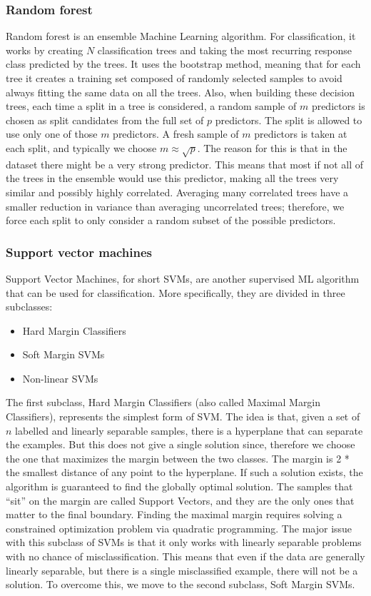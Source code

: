 \documentclass[journal]{IEEEtran}
\begin{document}
\subsubsection{Random forest}
Random forest is an ensemble Machine Learning algorithm. For classification, it works by creating $N$ classification trees and taking the most recurring response class predicted by the trees. It uses the bootstrap method, meaning that for each tree it creates a training set composed of randomly selected samples to avoid always fitting the same data on all the trees. Also, when building these decision trees, each time a split in a tree is considered, a random sample of $m$ predictors is chosen as split candidates from the full set of $p$ predictors. The split is allowed to use only one of those $m$ predictors. A fresh sample of $m$ predictors is taken at each split, and typically we choose $m \approx \sqrt{p}$. The reason for this is that in the dataset there might be a very strong predictor. This means that most if not all of the trees in the ensemble would use this predictor, making all the trees very similar and possibly highly correlated. Averaging many correlated trees have a smaller reduction in variance than averaging uncorrelated trees; therefore, we force each split to only consider a random subset of the possible predictors.

\subsubsection{Support vector machines}
Support Vector Machines, for short SVMs, are another supervised ML algorithm that can be used for classification. More specifically, they are divided in three subclasses:
\begin{itemize}
    \item Hard Margin Classifiers
    \item Soft Margin SVMs
    \item Non-linear SVMs
\end{itemize}
The first subclass, Hard Margin Classifiers (also called Maximal Margin Classifiers), represents the simplest form of SVM. The idea is that, given a set of $n$ labelled and linearly separable samples, there is a hyperplane that can separate the examples. But this does not give a single solution since, therefore we choose the one that maximizes the margin between the two classes. The margin is 2 * the smallest distance of any point to the hyperplane. If such a solution exists, the algorithm is guaranteed to find the globally optimal solution. The samples that “sit” on the margin are called Support Vectors, and they are the only ones that matter to the final boundary. Finding the maximal margin requires solving a constrained optimization problem via quadratic programming. The major issue with this subclass of SVMs is that it only works with linearly separable problems with no chance of misclassification. This means that even if the data are generally linearly separable, but there is a single misclassified example, there will not be a solution.
To overcome this, we move to the second subclass, Soft Margin SVMs.
\end{document}
